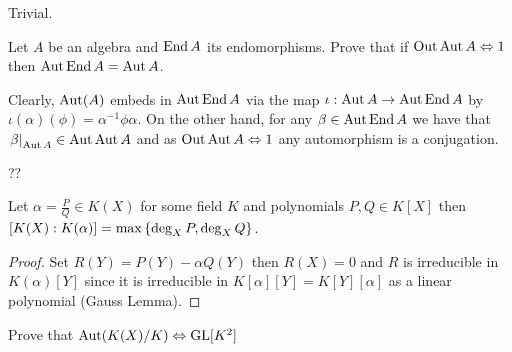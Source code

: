 \documentclass[8pt,a4paper]{article}
\begin{document}
\begin{solution}
    Trivial.
\end{solution}

\begin{exercise} Let $A$ be an algebra and $\End{A}$ its endomorphisms. Prove that if $\Out{\Aut{A}}\iso 1$ then $\Aut{\End{A}}=\Aut{A}$.
\end{exercise}
\def\iso{\equiv}
\begin{solution}
    Clearly, $\mathop\mathrm{Aut}\nolimits(A)$ embeds in $\Aut{\End{A}}$ via the map $\iota:\Aut{A}\to\Aut{\End{A}}$ by $\iota(\alpha)(\phi)=\alpha^{-1}\phi\alpha$. On the other hand, for any $\beta\in\Aut{\End{A}}$ we have that $\left. \beta\right\vert_{\mathop\mathrm{Aut}\nolimits{A}}\in\mathop\mathrm{Aut}\nolimits{\mathop\mathrm{Aut}\nolimits{A}}$ and as $\Out{\Aut{A}}\iso 1$ any automorphism is a conjugation.

??
\end{solution}

\begin{lemma} Let $\alpha=\frac{P}{Q}\in K(X)$ for some field $K$ and polynomials $P,Q\in K[X]$ then $[K(X):K(\alpha)]=\max\set{\deg_X{P},\deg_X{Q}}$.
\end{lemma}

\begin{proof}
    Set $R(Y)=P(Y)-\alpha Q(Y)$ then $R(X)=0$ and $R$ is irreducible in $K(\alpha)[Y]$ since it is irreducible in $K[\alpha][Y]=K[Y][\alpha]$ as a linear polynomial (Gauss Lemma).
\end{proof}
    
\begin{exercise}
    Prove that $\Aut(K(X)/K)\iso \GL[K^2]$
\end{exercise}
\end{document}
